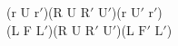(r U $\text{r}'$)(R U $\text{R}'$ $\text{U}'$)(r $\text{U}'$ $\text{r}'$)\\
(L F $\text{L}'$)(R U $\text{R}'$ $\text{U}'$)(L $\text{F}'$ $\text{L}'$)\\
